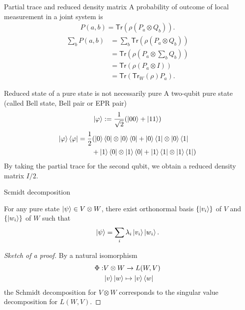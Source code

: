 \documentclass[10pt]{beamer}
\newcommand{\Tr}{\mathsf{Tr}}
\begin{document}
\begin{frame}{Partial trace and reduced density matrix}
A probability of outcome of local measurement in a joint system is
\begin{align*}
P(a, b) = \Tr(\rho (P_a \otimes Q_b)).
\end{align*}
\begin{align*}
\sum_b P(a, b) &= \sum_b \Tr(\rho (P_a \otimes Q_b))\\
 &=  \Tr\left(\rho \left(P_a \otimes \sum_b Q_b\right)\right)\\
 &=  \Tr\left(\rho \left(P_a \otimes I\right)\right)\\
 &=  \Tr(\Tr_W(\rho) P_a).
\end{align*}
\begin{equation*}
\end{equation*}
\end{frame}

\begin{frame}{Reduced state of a pure state is not necessarily pure}
A two-qubit pure state (called Bell state, Bell pair or EPR pair)
\begin{align*}
\ket{\varphi} := \frac1{\sqrt{2}}(\ket{00}+\ket{11})
\end{align*}
\begin{align*}
\ket{\varphi}\bra{\varphi}&=\frac12(\ket{0}\bra{0}\otimes \ket{0}\bra{0} + \ket{0}\bra{1}\otimes \ket{0}\bra{1} \\
&\qquad + \ket{1}\bra{0}\otimes \ket{1}\bra{0} + \ket{1}\bra{1}\otimes \ket{1}\bra{1} )
\end{align*}
By taking the partial trace for the second qubit, we obtain a reduced density matrix $I/2$.
\end{frame}
\fi


\begin{frame}{Scmidt decomposition}
\begin{theorem}
For any pure state $\ket{\psi}\in V\otimes W$, there exist orthonormal basis $\{\ket{v_i}\}$ of $V$ and $\{\ket{w_i}\}$ of $W$ such that
\begin{equation*}
\ket{\psi}=\sum_i\lambda_i \ket{v_i}\ket{w_i}.
\end{equation*}
\end{theorem}
\begin{proof}[Sketch of a proof]
By a natural isomorphism
\begin{align*}
\Phi:& V\otimes W \to L(W,V)\\
&\ket{v}\ket{w}\mapsto \ket{v}\bra{w}
\end{align*}
the Schmidt decomposition for $V\otimes W$ corresponds to the singular value decomposition for $L(W, V)$.
\end{proof}
\end{frame}
\fi
\end{document}
